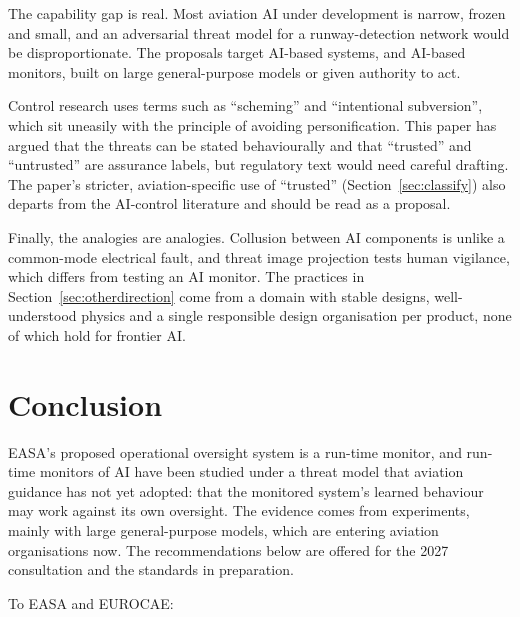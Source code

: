 \documentclass[11pt]{article}
\begin{document}
The capability gap is real. Most aviation AI under development is narrow, frozen and small, and an adversarial threat model for a runway-detection network would be disproportionate. The proposals target AI-based systems, and AI-based monitors, built on large general-purpose models or given authority to act.

Control research uses terms such as ``scheming'' and ``intentional subversion'', which sit uneasily with the principle of avoiding personification. This paper has argued that the threats can be stated behaviourally and that ``trusted'' and ``untrusted'' are assurance labels, but regulatory text would need careful drafting. The paper's stricter, aviation-specific use of ``trusted'' (Section~\ref{sec:classify}) also departs from the AI-control literature and should be read as a proposal.

Finally, the analogies are analogies. Collusion between AI components is unlike a common-mode electrical fault, and threat image projection tests human vigilance, which differs from testing an AI monitor. The practices in Section~\ref{sec:otherdirection} come from a domain with stable designs, well-understood physics and a single responsible design organisation per product, none of which hold for frontier AI.

\section{Conclusion}\label{sec:conclusion}

EASA's proposed operational oversight system is a run-time monitor, and run-time monitors of AI have been studied under a threat model that aviation guidance has not yet adopted: that the monitored system's learned behaviour may work against its own oversight. The evidence comes from experiments, mainly with large general-purpose models, which are entering aviation organisations now. The recommendations below are offered for the 2027 consultation and the standards in preparation.

To EASA and EUROCAE:
\end{document}
